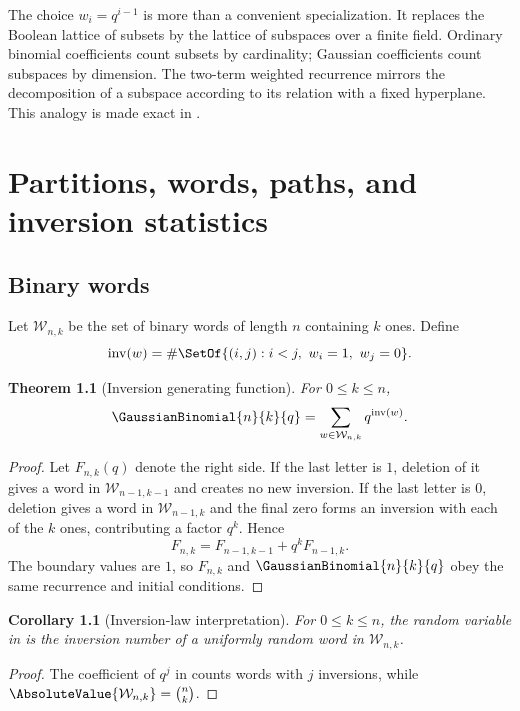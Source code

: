 \documentclass[11pt,a4paper,oneside,openany]{book}
\newtheorem{theorem}{Theorem}[chapter]
\newtheorem{corollary}[corollary]{Corollary}
\theoremstyle{definition}
\theoremstyle{remark}
\newcommand{\inv}{\operatorname{inv}}
\begin{document}
The choice $w_i=q^{i-1}$ is more than a convenient specialization.  It replaces the Boolean lattice of subsets by the lattice of subspaces over a finite field.  Ordinary binomial coefficients count subsets by cardinality; Gaussian coefficients count subspaces by dimension.  The two-term weighted recurrence mirrors the decomposition of a subspace according to its relation with a fixed hyperplane.  This analogy is made exact in .

\chapter{Partitions, words, paths, and inversion statistics}\label{chap:combinatorics}

\section{Binary words}

Let $\mathcal W_{n,k}$ be the set of binary words of length $n$ containing $k$ ones.  Define
\[
 \inv(w)=\#\SetOf{(i,j):i<j,\ w_i=1,\ w_j=0}.
\]

\begin{theorem}[Inversion generating function]\label{thm:binary-inversions}
For $0\le k\le n$,
\[
 \GaussianBinomial{n}{k}{q}=\sum_{w\in\mathcal W_{n,k}}q^{\inv(w)}.
\]
\end{theorem}

\begin{proof}
Let $F_{n,k}(q)$ denote the right side.  If the last letter is $1$, deletion of it gives a word in $\mathcal W_{n-1,k-1}$ and creates no new inversion.  If the last letter is $0$, deletion gives a word in $\mathcal W_{n-1,k}$ and the final zero forms an inversion with each of the $k$ ones, contributing a factor $q^k$.  Hence
\[
 F_{n,k}=F_{n-1,k-1}+q^kF_{n-1,k}.
\]
The boundary values are $1$, so $F_{n,k}$ and $\GaussianBinomial{n}{k}{q}$ obey the same recurrence and initial conditions.
\end{proof}

\begin{corollary}[Inversion-law interpretation]\label{cor:qbinom-inversion-law}
For $0\le k\le n$, the random variable in  is the
inversion number of a uniformly random word in $\mathcal W_{n,k}$.
\end{corollary}

\begin{proof}
The coefficient of $q^j$ in  counts words with $j$ inversions, while $\AbsoluteValue{\mathcal W_{n,k}}=\binom nk$.
\end{proof}
\end{document}
